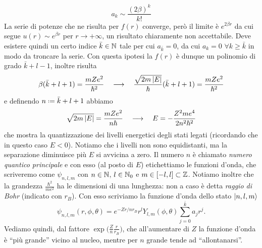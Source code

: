 \begin{equation}
	a_k\sim\frac{(2\beta)^k}{k!}
\end{equation}
La serie di potenze che ne risulta per $f(r)$ converge, però il limite è $e^{2\beta r}$ da cui segue $u(r)\sim e^{\beta r}$ per $r\to+\infty$, un risultato chiaramente non accettabile.
Deve esistere quindi un certo indice $\bar{k}\in\mathbb{N}$ tale per cui $a_{\bar{k}}=0$, da cui $a_k=0$ $\forall k\ge\bar{k}$ in modo da troncare la serie.
Con questa ipotesi la $f(r)$ è dunque un polinomio di grado $\bar{k}+l-1$, inoltre risulta
\begin{equation}
	\beta(\bar{k}+l+1)=\frac{mZe^2}{\hbar^2}\quad\longrightarrow\quad\frac{\sqrt{2m\left|{E}\right|}}{\hbar}(\bar{k}+l+1)=\frac{mZe^2}{\hbar^2}
\end{equation}
e definendo $n\defeq\bar{k}+l+1$ abbiamo
\begin{equation}
	\sqrt{2m\left|{E}\right|}=\frac{mZe^2}{n\hbar}\quad\longrightarrow\quad E=-\frac{Z^2me^4}{2n^2\hbar^2}
	\label{eq:energia-idrogeno}
\end{equation}
che mostra la quantizzazione dei livelli energetici degli stati legati (ricordando che in questo caso $E<0$).
Notiamo che i livelli non sono equidistanti, ma la separazione diminuisce più $E$ si avvicina a zero.
Il numero $n$ è chiamato \emph{numero quantico principale} e con esso (al posto di $E$) etichettiamo le funzioni d'onda, che scriveremo come $\psi_{n,l,m}$ con $n\in\mathbb{N}$, $l\in\mathbb{N}_0$ e $m\in[-l,l]\subset\mathbb{Z}$.
Notiamo inoltre che la grandezza $\frac{\hbar^2}{me^2}$ ha le dimensioni di una lunghezza: non a caso è detta \emph{raggio di Bohr} (indicato con $r_B$).
Con esso scriviamo la funzione d'onda dello stato $\left|{n,l,m}\right\rangle$
\begin{equation}
	\psi_{n,l,m}(r,\phi,\theta)=e^{-Zr/nr_B}r^lY_{l,m}(\phi,\theta)\sum_{j=0}^{\bar{k}}a_jr^j.
	\label{eq:wf-idrogeno}
\end{equation}
Vediamo quindi, dal fattore $\exp\big(\frac{Z}{n}\frac{r}{r_B}\big)$, che all'aumentare di $Z$ la funzione d'onda è ``più grande'' vicino al nucleo, mentre per $n$ grande tende ad ``allontanarsi''.

